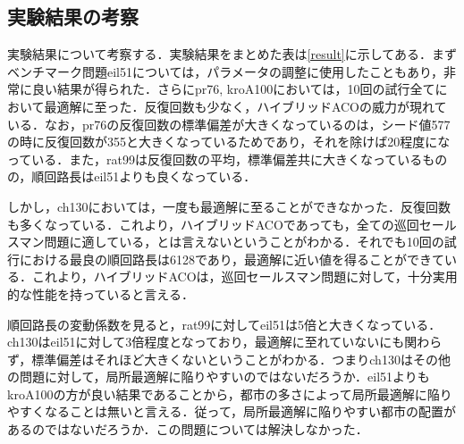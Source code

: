 \documentclass[a4j]{jsarticle}
\begin{document}
\subsection{実験結果の考察}
実験結果について考察する．実験結果をまとめた表は\ref{result}に示してある．まずベンチマーク問題eil51については，パラメータの調整に使用したこともあり，非常に良い結果が得られた．さらにpr76, kroA100においては，10回の試行全てにおいて最適解に至った．反復回数も少なく，ハイブリッドACOの威力が現れている．なお，pr76の反復回数の標準偏差が大きくなっているのは，シード値577の時に反復回数が355と大きくなっているためであり，それを除けば20程度になっている．また，rat99は反復回数の平均，標準偏差共に大きくなっているものの，順回路長はeil51よりも良くなっている．
\par
しかし，ch130においては，一度も最適解に至ることができなかった．反復回数も多くなっている．これより，ハイブリッドACOであっても，全ての巡回セールスマン問題に適している，とは言えないということがわかる．それでも10回の試行における最良の順回路長は6128であり，最適解に近い値を得ることができている．これより，ハイブリッドACOは，巡回セールスマン問題に対して，十分実用的な性能を持っていると言える．
\par
順回路長の変動係数を見ると，rat99に対してeil51は5倍と大きくなっている．ch130はeil51に対して3倍程度となっており，最適解に至れていないにも関わらず，標準偏差はそれほど大きくないということがわかる．つまりch130はその他の問題に対して，局所最適解に陥りやすいのではないだろうか．eil51よりもkroA100の方が良い結果であることから，都市の多さによって局所最適解に陥りやすくなることは無いと言える．従って，局所最適解に陥りやすい都市の配置があるのではないだろうか．この問題については解決しなかった．
\end{document}
